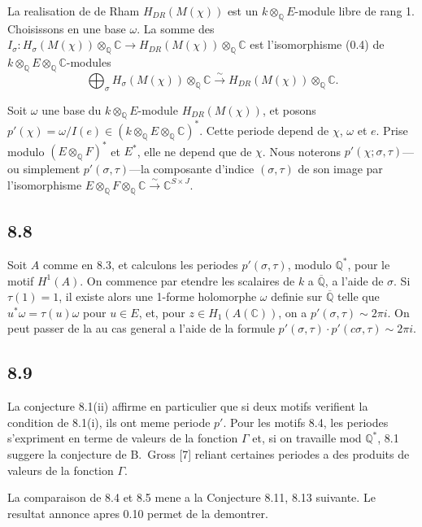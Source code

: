 \documentclass[12pt,a4paper]{article}
\theoremstyle{plain}
\theoremstyle{definition}
\theoremstyle{remark}
\newcommand{\Q}{\mathbb{Q}}
\newcommand{\C}{\mathbb{C}}
\begin{document}
La realisation de de Rham $H_{DR}(M(\chi))$ est un $k \otimes_\Q E$-module libre de rang 1.
Choisissons en une base $\omega$. La somme des $I_\sigma: H_\sigma(M(\chi)) \otimes_\Q \C \to
H_{DR}(M(\chi)) \otimes_\Q \C$ est l'isomorphisme (0.4) de $k \otimes_\Q E \otimes_\Q \C$-modules
\[
\bigoplus_\sigma H_\sigma(M(\chi)) \otimes_\Q \C \xrightarrow{\sim} H_{DR}(M(\chi)) \otimes_\Q \C.
\]

Soit $\omega$ une base du $k \otimes_\Q E$-module $H_{DR}(M(\chi))$, et posons
$p'(\chi) = \omega/I(e) \in (k \otimes_\Q E \otimes_\Q \C)^*$. Cette periode depend de $\chi$, $\omega$ et $e$.
Prise modulo $(E \otimes_\Q F)^*$ et $E^*$, elle ne depend que de $\chi$. Nous noterons
$p'(\chi; \sigma, \tau)$---ou simplement $p'(\sigma, \tau)$---la composante d'indice $(\sigma, \tau)$ de
son image par l'isomorphisme $E \otimes_\Q F \otimes_\Q \C \xrightarrow{\sim} \C^{S \times J}$.

\subsection*{8.8}

Soit $A$ comme en 8.3, et calculons les periodes $p'(\sigma, \tau)$, modulo $\Q^*$, pour le
motif $H^1(A)$. On commence par etendre les scalaires de $k$ a $\overline{\Q}$, a l'aide de $\sigma$.
Si $\tau(1) = 1$, il existe alors une 1-forme holomorphe $\omega$ definie sur $\overline{\Q}$ telle que
$u^* \omega = \tau(u) \omega$ pour $u \in E$, et, pour $z \in H_1(A(\C))$, on a $p'(\sigma, \tau) \sim 2\pi i$.
On peut passer de la au cas general a l'aide de la formule
$p'(\sigma, \tau) \cdot p'(c\sigma, \tau) \sim 2\pi i$.

\subsection*{8.9}

La conjecture 8.1(ii) affirme en particulier que si deux motifs verifient la
condition de 8.1(i), ils ont meme periode $p'$. Pour les motifs 8.4, les periodes
s'expriment en terme de valeurs de la fonction $\Gamma$ et, si on travaille mod $\Q^*$,
8.1 suggere la conjecture de B.~Gross [7] reliant certaines periodes a des produits
de valeurs de la fonction $\Gamma$.

La comparaison de 8.4 et 8.5 mene a la Conjecture 8.11, 8.13 suivante. Le resultat
annonce apres 0.10 permet de la demontrer.
\end{document}
